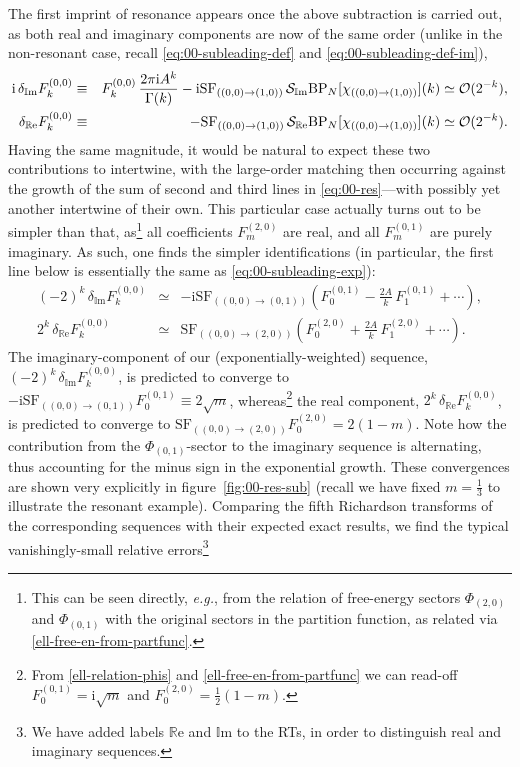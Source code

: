 \documentclass[11pt,a4paper]{article}
\newcommand{\CO}{{\cal O}}
\newcommand{\CS}{{\cal S}}
\def\im{{\mathbb{I}}{\mathrm{m}}}
\def\re{{\mathbb{R}}{\mathrm{e}}}
\begin{document}
\noindent
The first imprint of resonance appears once the above subtraction is carried out, as both real and imaginary components are now of the same order (unlike in the non-resonant case, recall \eqref{eq:00-subleading-def} and \eqref{eq:00-subleading-def-im}),
%
\begin{eqnarray}
\label{eq:res-00-subl-im}
\mathrm{i}\, \delta_{\im} F^{(0,0)}_k &\equiv& F_k^{(0,0)}\, \frac{2\pi\mathrm{i}A^{k}}{\Gamma(k)} - \mathrm{i} \mathrm{SF}_{( (0,0) \rightarrow (1,0) )}\, \CS_{\im} \mathrm{BP}_{N} [\chi_{( (0,0) \rightarrow (1,0) )}] (k) \simeq \CO (2^{-k}), \\
\label{eq:res-00-subl-re}
\delta_{\re} F^{(0,0)}_k &\equiv& - \mathrm{SF}_{( (0,0) \rightarrow (1,0) )}\, \CS_{\re} \mathrm{BP}_{N} [\chi_{( (0,0) \rightarrow (1,0) )}] (k) \simeq \CO (2^{-k}).
\end{eqnarray}
%
\noindent
Having the same magnitude, it would be natural to expect these two contributions to intertwine, with the large-order matching then occurring against the growth of the sum of second and third lines in \eqref{eq:00-res}---with possibly yet another intertwine of their own. This particular case actually turns out to be simpler than that, as\footnote{This can be seen directly, \textit{e.g.}, from the relation of free-energy sectors $\Phi_{(2,0)}$ and $\Phi_{(0,1)}$ with the original sectors in the partition function, as related via \eqref{ell-free-en-from-partfunc}.} all coefficients $F_m^{(2,0)}$ are real, and all $F_m^{(0,1)}$ are purely imaginary. As such, one finds the simpler identifications (in particular, the first line below is essentially the same as \eqref{eq:00-subleading-exp}):
%
\begin{eqnarray}
(-2)^k\, \delta_{\im} F^{(0,0)}_k &\simeq& - \mathrm{i} \mathrm{SF}_{( (0,0) \rightarrow (0,1) )} \left( F_0^{(0,1)} - \frac{2A}{k}\, F_1^{(0,1)} + \cdots \right), \\
2^k\, \delta_{\re} F^{(0,0)}_k &\simeq& \mathrm{SF}_{( (0,0) \rightarrow (2,0) )} \left( F_0^{(2,0)} + \frac{2A}{k}\, F_1^{(2,0)} + \cdots \right).
\end{eqnarray}
%
\noindent
The imaginary-component of our (exponentially-weighted) sequence, $(-2)^k\, \delta_{\im} F^{(0,0)}_k$, is predicted to converge to $-\mathrm{i} \mathrm{SF}_{( (0,0) \rightarrow (0,1) )} F_0^{(0,1)} \equiv 2\sqrt{m}$, whereas\footnote{From \eqref{ell-relation-phis} and \eqref{ell-free-en-from-partfunc} we can read-off $F_0^{(0,1)} = \mathrm{i}\sqrt{m}$ and $F_0^{(2,0)}=\frac{1}{2} (1-m)$.} the real component, $2^k\, \delta_{\re} F^{(0,0)}_k$, is predicted to converge to $\mathrm{SF}_{( (0,0) \rightarrow (2,0) )} F_0^{(2,0)} = 2(1-m)$. Note how the contribution from the $\Phi_{(0,1)}$-sector to the imaginary sequence is alternating, thus accounting for the minus sign in the exponential growth. These convergences are shown very explicitly in figure~\ref{fig:00-res-sub} (recall we have fixed $m=\frac{1}{3}$ to illustrate the resonant example). Comparing the fifth Richardson transforms of the corresponding sequences with their expected exact results, we find the typical vanishingly-small relative errors\footnote{We have added labels $\re$ and $\im$ to the RTs, in order to distinguish real and imaginary sequences.}
\end{document}
